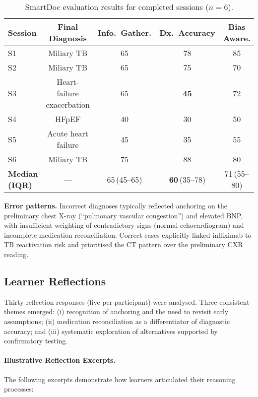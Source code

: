 \begin{table}[h]
\centering
\caption{SmartDoc evaluation results for completed sessions (\(n=6\)).}
\label{tab:evaluation_results}
\begin{tabular}{lcccc}
\toprule
\textbf{Session} & \textbf{Final Diagnosis} &
\textbf{Info.\ Gather.} & \textbf{Dx.\ Accuracy} & \textbf{Bias Aware.} \\
\midrule
S1 & Miliary TB                 & 65 & 78 & 85 \\
S2 & Miliary TB                 & 65 & 75 & 70 \\
S3 & Heart-failure exacerbation & 65 & \textbf{45} & 72 \\
S4 & HFpEF                      & 40 & 30 & 50 \\
S5 & Acute heart failure        & 45 & 35 & 55 \\
S6 & Miliary TB                 & 75 & 88 & 80 \\
\midrule
\textbf{Median (IQR)} & --- & 65\,(45–65) & \textbf{60}\,(35–78) & 71\,(55–80) \\
\bottomrule
\end{tabular}
\end{table}

\noindent
\textbf{Error patterns.}
Incorrect diagnoses typically reflected anchoring on the preliminary chest X-ray
(``pulmonary vascular congestion'') and elevated BNP, with insufficient weighting of
contradictory signs (normal echocardiogram) and incomplete medication reconciliation.
Correct cases explicitly linked infliximab to TB reactivation risk and prioritised the
CT pattern over the preliminary CXR reading.

\subsection{Learner Reflections}
Thirty reflection responses (five per participant) were analysed.
Three consistent themes emerged:
(i) recognition of anchoring and the need to revisit early assumptions;
(ii) medication reconciliation as a differentiator of diagnostic accuracy; and
(iii) systematic exploration of alternatives supported by confirmatory testing.

\paragraph{Illustrative Reflection Excerpts.}
The following excerpts demonstrate how learners articulated their reasoning processes:

